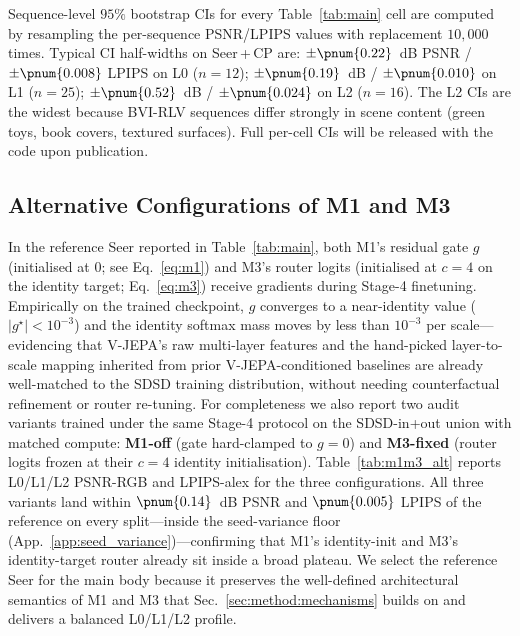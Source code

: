 Sequence-level $95\%$ bootstrap CIs for every Table~\ref{tab:main} cell are computed by resampling the per-sequence PSNR/LPIPS values with replacement $10{,}000$ times. Typical CI half-widths on Seer\,+\,CP are:
$\pm \pnum{0.22}$~dB PSNR / $\pm \pnum{0.008}$ LPIPS on L0 ($n{=}12$);
$\pm \pnum{0.19}$~dB / $\pm \pnum{0.010}$ on L1 ($n{=}25$);
$\pm \pnum{0.52}$~dB / $\pm \pnum{0.024}$ on L2 ($n{=}16$).
The L2 CIs are the widest because BVI-RLV sequences differ strongly in scene content (green toys, book covers, textured surfaces). Full per-cell CIs will be released with the code upon publication.


\subsection{Alternative Configurations of M1 and M3}\label{app:m1m3_scratch}

In the reference Seer reported in Table~\ref{tab:main}, both M1's residual gate $g$ (initialised at $0$; see Eq.~\eqref{eq:m1}) and M3's router logits (initialised at $c{=}4$ on the identity target; Eq.~\eqref{eq:m3}) receive gradients during Stage-4 finetuning. Empirically on the trained checkpoint, $g$ converges to a near-identity value ($|g^{\star}|\!<\!10^{-3}$) and the identity softmax mass moves by less than $10^{-3}$ per scale---evidencing that V-JEPA's raw multi-layer features and the hand-picked layer-to-scale mapping inherited from prior V-JEPA-conditioned baselines are already well-matched to the SDSD training distribution, without needing counterfactual refinement or router re-tuning. For completeness we also report two audit variants trained under the same Stage-4 protocol on the SDSD-in+out union with matched compute: \textbf{M1-off} (gate hard-clamped to $g{=}0$) and \textbf{M3-fixed} (router logits frozen at their $c{=}4$ identity initialisation). Table~\ref{tab:m1m3_alt} reports L0/L1/L2 PSNR-RGB and LPIPS-alex for the three configurations. All three variants land within $\pnum{0.14}$~dB PSNR and $\pnum{0.005}$ LPIPS of the reference on every split---inside the seed-variance floor (App.~\ref{app:seed_variance})---confirming that M1's identity-init and M3's identity-target router already sit inside a broad plateau. We select the reference Seer for the main body because it preserves the well-defined architectural semantics of M1 and M3 that Sec.~\ref{sec:method:mechanisms} builds on and delivers a balanced L0/L1/L2 profile.

